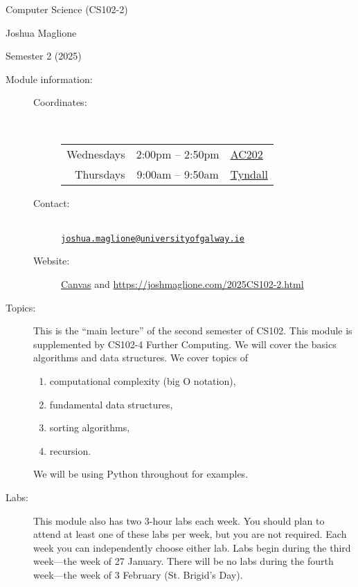 \documentclass[a4paper, 12pt]{article}
\begin{document}
\pagestyle{empty}

\begin{center}
{\Large Computer Science (CS102-2)} 

\vspace{0.25cm}

{\large Joshua Maglione}

\vspace{0.25cm}

Semester 2 (2025)
\end{center}

\vspace{0.5cm}

\begin{description}
    \item[Module information:] \hfill
    \begin{description}
      \item[Coordinates:] \hfill \\ [0.5em]
        \begin{tabular}{rcl}
          Wednesdays & 2:00pm -- 2:50pm & \href{https://clients.mapsindoors.com/nuigalwayweb/9167eab0dc78437c93c76b57/details/22185f1db04149f3ab4bac48}{AC202} \\ Thursdays & 9:00am -- 9:50am & \href{https://clients.mapsindoors.com/nuigalwayweb/9167eab0dc78437c93c76b57/details/76ccb06aa36c4758823836e7}{Tyndall}
        \end{tabular}
      \item[Contact:] \hfill \\ \href{mailto:joshua.maglione@universityofgalway.ie}{\texttt{joshua.maglione@universityofgalway.ie}}
      \item[Website:] \href{https://universityofgalway.instructure.com/}{\textsf{Canvas}} and \url{https://joshmaglione.com/2025CS102-2.html} 
    \end{description} 
    \vspace{1cm}
    \item[Topics:] This is the ``main lecture'' of the second semester of CS102. This module is supplemented by CS102-4 Further Computing. We will cover the basics algorithms and data structures. We cover topics of
    \begin{enumerate} 
      \item computational complexity (big O notation),
      \item fundamental data structures,
      \item sorting algorithms,
      \item recursion.
    \end{enumerate} 
    We will be using Python throughout for examples.
    \vspace{1cm}
    \item[Labs:] This module also has two 3-hour labs each week. You should plan to attend at least one of these labs per week, but you are not required. Each week you can independently choose either lab. Labs begin during the third week---the week of 27 January. There will be no labs during the fourth week---the week of 3 February (St. Brigid's Day).
    

\end{description}
\end{document}
